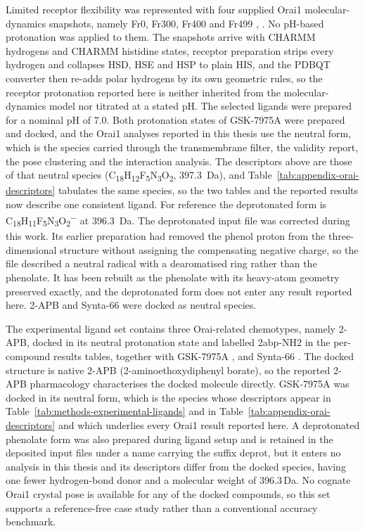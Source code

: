 Limited receptor flexibility was represented with four supplied Orai1 molecular-dynamics snapshots, namely Fr0, Fr300, Fr400 and Fr499 \cite{ref038}, \cite{ref072}. No pH-based protonation was applied to them. The snapshots arrive with CHARMM hydrogens and CHARMM histidine states, receptor preparation strips every hydrogen and collapses HSD, HSE and HSP to plain HIS, and the PDBQT converter then re-adds polar hydrogens by its own geometric rules, so the receptor protonation reported here is neither inherited from the molecular-dynamics model nor titrated at a stated pH. The selected ligands were prepared for a nominal pH of 7.0. Both protonation states of GSK-7975A were prepared and docked, and the Orai1 analyses reported in this thesis use the neutral form, which is the species carried through the transmembrane filter, the validity report, the pose clustering and the interaction analysis. The descriptors above are those of that neutral species (C\textsubscript{18}H\textsubscript{12}F\textsubscript{5}N\textsubscript{3}O\textsubscript{2}, 397.3~Da), and Table~\ref{tab:appendix-orai-descriptors} tabulates the same species, so the two tables and the reported results now describe one consistent ligand. For reference the deprotonated form is C\textsubscript{18}H\textsubscript{11}F\textsubscript{5}N\textsubscript{3}O\textsubscript{2}\textsuperscript{\ensuremath{-}} at 396.3~Da. The deprotonated input file was corrected during this work. Its earlier preparation had removed the phenol proton from the three-dimensional structure without assigning the compensating negative charge, so the file described a neutral radical with a dearomatised ring rather than the phenolate. It has been rebuilt as the phenolate with its heavy-atom geometry preserved exactly, and the deprotonated form does not enter any result reported here. 2-APB and Synta-66 were docked as neutral species.

The experimental ligand set contains three Orai-related chemotypes, namely 2-APB, docked in its neutral protonation state and labelled 2abp-NH2 in the per-compound results tables, together with GSK-7975A \cite{ref041}, \cite{ref070} and Synta-66 \cite{ref071}. The docked structure is native 2-APB (2-aminoethoxydiphenyl borate), so the reported 2-APB pharmacology \cite{ref040} characterises the docked molecule directly. GSK-7975A was docked in its neutral form, which is the species whose descriptors appear in Table~\ref{tab:methods-experimental-ligands} and in Table~\ref{tab:appendix-orai-descriptors} and which underlies every Orai1 result reported here. A deprotonated phenolate form was also prepared during ligand setup and is retained in the deposited input files under a name carrying the suffix deprot, but it enters no analysis in this thesis and its descriptors differ from the docked species, having one fewer hydrogen-bond donor and a molecular weight of 396.3\,Da. No cognate Orai1 crystal pose is available for any of the docked compounds, so this set supports a reference-free case study rather than a conventional accuracy benchmark.

